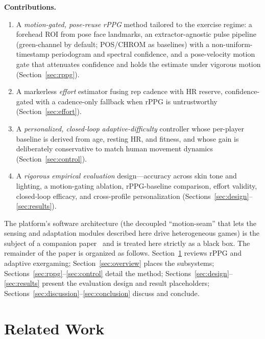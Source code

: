 \documentclass[journal,10pt]{IEEEtran}
\begin{document}
\textbf{Contributions.}
\begin{enumerate}
\item A \emph{motion-gated, pose-reuse rPPG} method tailored to the exercise
regime: a forehead ROI from pose face landmarks, an extractor-agnostic pulse
pipeline (green-channel by default; POS/CHROM as baselines) with a
non-uniform-timestamp periodogram and spectral confidence, and a pose-velocity
motion gate that attenuates confidence and holds the estimate under vigorous
motion (Section~\ref{sec:rppg}).
\item A markerless \emph{effort} estimator fusing rep cadence with HR reserve,
confidence-gated with a cadence-only fallback when rPPG is untrustworthy
(Section~\ref{sec:effort}).
\item A \emph{personalized, closed-loop adaptive-difficulty} controller whose
per-player baseline is derived from age, resting HR, and fitness, and whose gain
is deliberately conservative to match human movement dynamics
(Section~\ref{sec:control}).
\item A \emph{rigorous empirical evaluation} design---accuracy across skin tone
and lighting, a motion-gating ablation, rPPG-baseline comparison, effort validity,
closed-loop efficacy, and cross-profile personalization
(Sections~\ref{sec:design}--\ref{sec:results}).
\end{enumerate}

The platform's software architecture (the decoupled ``motion-seam'' that lets the
sensing and adaptation modules described here drive heterogeneous games) is the
subject of a companion paper~\cite{fitarcade-sdps} and is treated here strictly as
a black box. The remainder of the paper is organized as follows.
Section~\ref{sec:related} reviews rPPG and adaptive exergaming;
Section~\ref{sec:overview} places the subsystems; Sections~\ref{sec:rppg}--\ref{sec:control}
detail the method; Sections~\ref{sec:design}--\ref{sec:results} present the
evaluation design and result placeholders; Sections~\ref{sec:discussion}--\ref{sec:conclusion}
discuss and conclude.

\section{Related Work}\label{sec:related}
\end{document}
